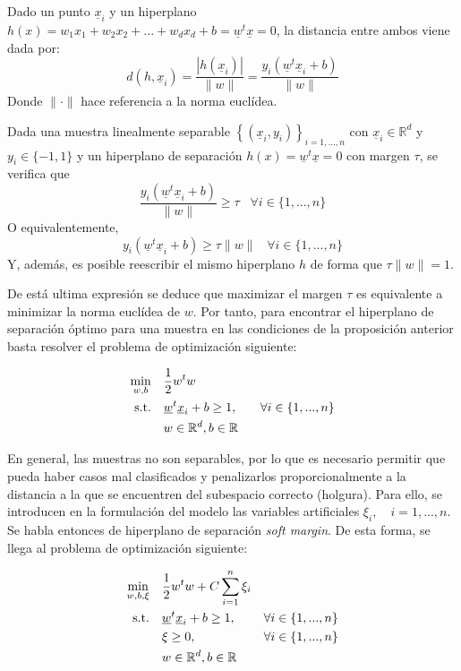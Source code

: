 \documentclass[12pt,a4paper,]{book}
\numberwithin{dummy}{section}
\theoremstyle{ocrenumbox}
\theoremstyle{blacknumex}
\theoremstyle{blacknumbox}
\theoremstyle{ocrenum}
\theoremstyle{ocrenum}
\begin{document}
Dado un punto \(\underline x_i\) y un hiperplano
\(h(x) = w_1x_1 +w_2x_2+...+w_dx_d +b = \underline w^t \underline x = 0\),
la distancia entre ambos viene dada por:
\[d(h,\underline x_i) = \frac{|h(\underline x_i)|}{\|w\|} = \frac{y_i(\underline w^t \underline x_i+b)}{\|w\|}\]
Donde \(\|\cdot\|\) hace referencia a la norma euclídea.

Dada una muestra linealmente separable
\(\left\{(\underline x_i,y_i) \right\}_{i=1,...,n}\) con
\(\underline x_i \in \mathbb{R}^d\) y \(y_i \in \{-1,1\}\) y un
hiperplano de separación \(h(x) = \underline w^t \underline x = 0\) con
margen \(\tau\), se verifica que
\[\frac{y_i(\underline w^t \underline x_i+b)}{\|w\|} \ge \tau \;\;\; \forall i\in \{1,...,n\}\]
O equivalentemente,
\[y_i(\underline w^t \underline x_i+b) \ge \tau\|w\| \;\;\; \forall i\in \{1,...,n\}\]
Y, además, es posible reescribir el mismo hiperplano \(h\) de forma que
\(\tau\|w\| = 1\).

De está ultima expresión se deduce que maximizar el margen \(\tau\) es
equivalente a minimizar la norma euclídea de \(w\). Por tanto, para
encontrar el hiperplano de separación óptimo para una muestra en las
condiciones de la proposición anterior basta resolver el problema de
optimización siguiente:

\begin{equation}
\begin{aligned}
\min_{w,b} \quad & \frac{1}{2}w^{t}w\\
\textrm{s.t.} \quad & \underline w^t \underline x_i+b \ge 1, \quad & \forall i\in \{1,...,n\} \\
  & w \in \mathbb{R}^d, \space b \in \mathbb{R} \\ 
\end{aligned}
\end{equation}

En general, las muestras no son separables, por lo que es necesario
permitir que pueda haber casos mal clasificados y penalizarlos
proporcionalmente a la distancia a la que se encuentren del subespacio
correcto (holgura). Para ello, se introducen en la formulación del
modelo las variables artificiales \(\xi_i,\quad i=1,...,n\). Se habla
entonces de hiperplano de separación \emph{soft margin}. De esta forma,
se llega al problema de optimización siguiente:

\begin{equation}
\begin{aligned}
\min_{w,b,\xi} \quad & \frac{1}{2}w^{t}w+C\sum_{i=1}^{n}{\xi_{i}}\\
\textrm{s.t.} \quad & \underline w^t \underline x_i+b \ge 1, \quad & \forall i\in \{1,...,n\}\\
  &\xi\geq0,   \quad & \forall i\in \{1,...,n\} \\
  & w \in \mathbb{R}^d, \space b \in \mathbb{R} \\
\end{aligned}
\end{equation}
\end{document}
